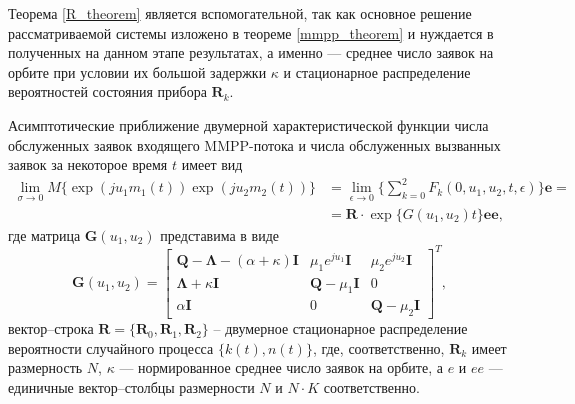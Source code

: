 Теорема \ref{R_theorem} является вспомогательной, так как основное решение рассматриваемой системы изложено в теореме \ref{mmpp_theorem} и нуждается в полученных на данном этапе результатах, а именно --- среднее число заявок на орбите при условии их большой задержки $\kappa$ и стационарное распределение вероятностей состояния прибора $\boldsymbol{R}_{k}$.

\begin{theorem} \label{mmpp_theorem}
	Асимптотические приближение двумерной характеристической функции числа обслуженных заявок входящего MMPP-потока и числа обслуженных вызванных заявок за некоторое время $t$ имеет вид
	\begin{equation*} \label{theorem_twodim_map}
		\begin{split}
		  \lim_{\sigma \xrightarrow{} 0} M\{\exp(ju_{1}m_{1}(t))\exp(ju_{2}m_{2}(t))\} &= 
			 \lim_{\epsilon \xrightarrow{} 0} \{ \sum_{k=0}^{2}F_{k}(0,u_{1},u_{2},t,\epsilon) \}\boldsymbol{e} =\\  &= \boldsymbol{R} \cdot \exp\{G(u_{1},u_{2})t\}\boldsymbol{ee},
		\end{split}
	\end{equation*}
	где матрица $\boldsymbol{G}(u_{1},u_{2})$ представима в виде
	\begin{equation*}
		\boldsymbol{G}(u_{1},u_{2})=\begin{bmatrix}
			\boldsymbol{Q}-\boldsymbol{\Lambda}-(\alpha + \kappa)\boldsymbol{I} & \mu_{1}e^{ju_{1}}\boldsymbol{I} &  \mu_{2}e^{ju_{2}}\boldsymbol{I}\\
			\boldsymbol{\Lambda}+\kappa\boldsymbol{I} & \boldsymbol{Q}-\mu_{1}\boldsymbol{I} & 0\\
			\alpha\boldsymbol{I} & 	0 &	\boldsymbol{Q}-\mu_{2}\boldsymbol{I}
		\end{bmatrix}^{T},
	\end{equation*}
	вектор--строка $\boldsymbol{R}=\{\boldsymbol{R}_{0},\boldsymbol{R}_{1},\boldsymbol{R}_{2}\}$ -- двумерное стационарное распределение вероятности случайного процесса $\{k(t),n(t)\}$, где, соответственно,  $\boldsymbol{R}_{k}$ имеет размерность $N$, $\kappa$ --- нормированное среднее число заявок на орбите, а $e$ и $ee$ --- единичные вектор--столбцы размерности $N$ и $N \cdot K$ соответственно.
\end{theorem}
